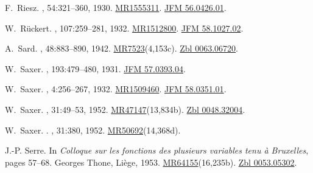 \documentclass[11pt,a4paper, final, twoside]{article}
\numberwithin{equation}{section}
\begin{document}
\begin{appendices}
\begin{thebibliography}{100}
F.~Riesz.
, 54:321--360, 1930.
\newblock \href{http://www.ams.org/mathscinet-getitem?mr=1555311}{MR1555311}.
  \href{http://zbmath.org/?q=an:56.0426.01}{JFM 56.0426.01}.

W.~R\"uckert.
, 107:259--281, 1932.
\newblock \href{http://www.ams.org/mathscinet-getitem?mr=1512800}{MR1512800}.
  \href{http://zbmath.org/?q=an:58.1027.02}{JFM 58.1027.02}.

A.~Sard.
, 48:883--890,
  1942.
\newblock \href{http://www.ams.org/mathscinet-getitem?mr=7523}{MR7523}(4,153c).
  \href{http://zbmath.org/?q=an:0063.06720}{Zbl 0063.06720}.

W.~Saxer.
, 193:479--480, 1931.
\newblock \href{http://zbmath.org/?q=an:57.0393.04}{JFM 57.0393.04}.

W.~Saxer.
, 4:256--267, 1932.
\newblock \href{http://www.ams.org/mathscinet-getitem?mr=1509460}{MR1509460}.
  \href{http://zbmath.org/?q=an:58.0351.01}{JFM 58.0351.01}.

W.~Saxer.
, 31:49--53, 1952.
\newblock
  \href{http://www.ams.org/mathscinet-getitem?mr=47147}{MR47147}(13,834b).
  \href{http://zbmath.org/?q=an:0048.32004}{Zbl 0048.32004}.

W.~Saxer.
.
, 31:380, 1952.
\newblock
  \href{http://www.ams.org/mathscinet-getitem?mr=50692}{MR50692}(14,368d).

J.-P. Serre.
\newblock In {\em Colloque sur les fonctions des plusieurs variables tenu {\`a}
  Bruxelles}, pages 57--68. Georges Thone, Li\`ege, 1953.
\newblock
  \href{http://www.ams.org/mathscinet-getitem?mr=64155}{MR64155}(16,235b).
  \href{http://zbmath.org/?q=an:0053.05302}{Zbl 0053.05302}.


\end{thebibliography}
\end{appendices}
\end{document}
